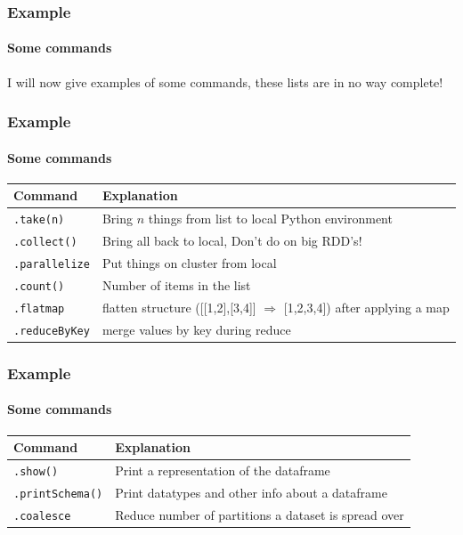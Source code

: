 \documentclass[aspectratio=169,dvipsnames]{beamer}
\begin{document}
    \begin{frame}
        \frametitle{Example}
        \framesubtitle{Some commands}
        I will now give examples of some commands, these lists are in no way complete!
    \end{frame}

    \begin{frame}
        \frametitle{Example}
        \framesubtitle{Some commands}
            \begin{center}
            \begin{tabular}{ll}
            \toprule
            Command & Explanation \\
            \midrule
            \texttt{.take(n)} & Bring $n$ things from list to local Python environment \\
            \texttt{.collect()} & Bring all back to local, \alert{Don't do on big RDD's!} \\
            \texttt{.parallelize} & Put things on cluster from local \\
            \texttt{.count()} & Number of items in the list \\
            \texttt{.flatmap} & flatten structure ([[1,2],[3,4]] $\Rightarrow$ [1,2,3,4]) after applying a map \\
            \texttt{.reduceByKey} & merge values by key during reduce \\
            \bottomrule
            \end{tabular}
            \end{center}
        \endoldBlock
    \end{frame}
    
    \begin{frame}
        \frametitle{Example}
        \framesubtitle{Some commands}
            \begin{center}
            \begin{tabular}{ll}
            \toprule
            Command & Explanation \\
            \midrule
            \texttt{.show()} & Print a representation of the dataframe \\
            \texttt{.printSchema()} & Print datatypes and other info about a dataframe \\
            \texttt{.coalesce} & Reduce number of partitions a dataset is spread over \\
            \bottomrule
            \end{tabular}
            \end{center}
        \endoldBlock
    \end{frame}
\end{document}
